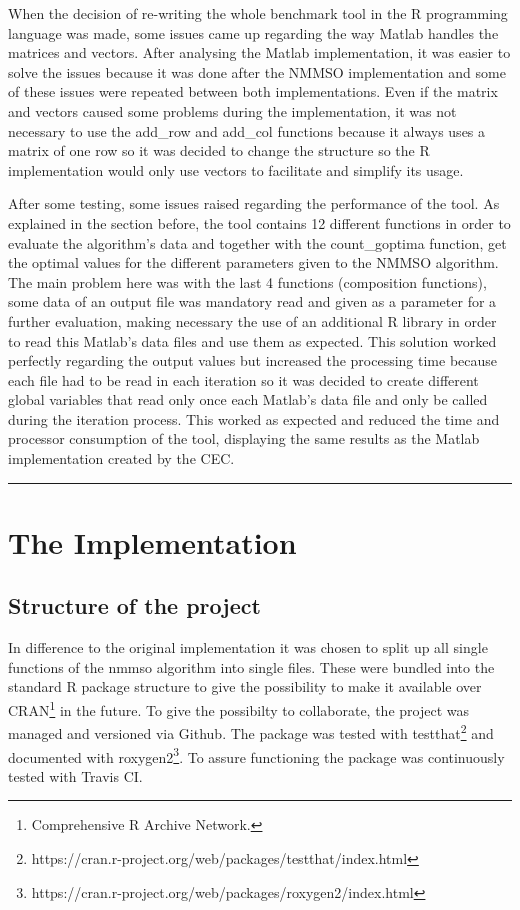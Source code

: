 \documentclass[12pt,a4paper]{article}
\begin{document}
When the decision of re-writing the whole benchmark tool in the R
programming language was made, some issues came up regarding the way
Matlab handles the matrices and vectors. After analysing the Matlab
implementation, it was easier to solve the issues because it was done
after the NMMSO implementation and some of these issues were repeated
between both implementations. Even if the matrix and vectors caused some
problems during the implementation, it was not necessary to use the
add\_row and add\_col functions because it always uses a matrix of one
row so it was decided to change the structure so the R implementation
would only use vectors to facilitate and simplify its usage.

After some testing, some issues raised regarding the performance of the
tool. As explained in the section before, the tool contains 12 different
functions in order to evaluate the algorithm's data and together with
the count\_goptima function, get the optimal values for the different
parameters given to the NMMSO algorithm. The main problem here was with
the last 4 functions (composition functions), some data of an output
file was mandatory read and given as a parameter for a further
evaluation, making necessary the use of an additional R library in order
to read this Matlab's data files and use them as expected. This solution
worked perfectly regarding the output values but increased the
processing time because each file had to be read in each iteration so it
was decided to create different global variables that read only once
each Matlab's data file and only be called during the iteration process.
This worked as expected and reduced the time and processor consumption
of the tool, displaying the same results as the Matlab implementation
created by the CEC.

\begin{center}\rule{0.5\linewidth}{\linethickness}\end{center}

\section{The Implementation}\label{the-implementation}

\subsection{Structure of the project}\label{structure-of-the-project}

In difference to the original implementation it was chosen to split up
all single functions of the nmmso algorithm into single files. These
were bundled into the standard R package structure to give the
possibility to make it available over CRAN\footnote{Comprehensive R
  Archive Network.} in the future. To give the possibilty to
collaborate, the project was managed and versioned via Github. The
package was tested with testthat\footnote{https://cran.r-project.org/web/packages/testthat/index.html}
and documented with roxygen2\footnote{https://cran.r-project.org/web/packages/roxygen2/index.html}.
To assure functioning the package was continuously tested with Travis
CI.
\end{document}
